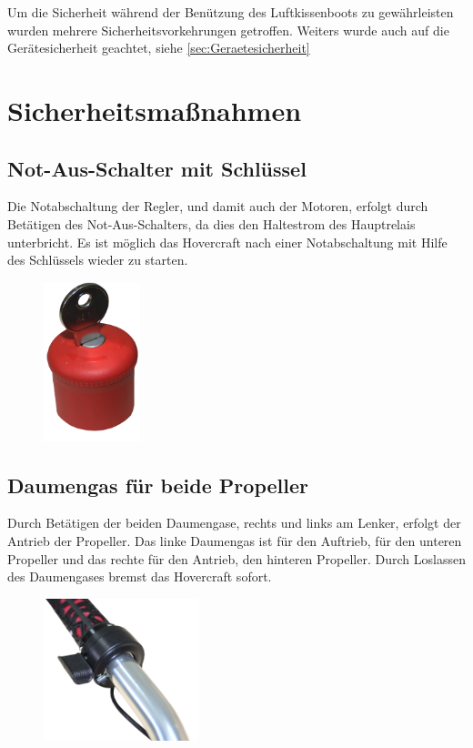
Um die Sicherheit während der Benützung des Luftkissenboots zu gewährleisten wurden mehrere Sicherheitsvorkehrungen getroffen. 
Weiters wurde auch auf die Gerätesicherheit geachtet, siehe \autoref{sec:Geraetesicherheit}
\section{Sicherheitsmaßnahmen}
\subsection{Not-Aus-Schalter mit Schlüssel}
Die Notabschaltung der Regler, und damit auch der Motoren, erfolgt durch Betätigen des Not-Aus-Schalters, da dies den Haltestrom des Hauptrelais unterbricht. 
Es ist möglich das Hovercraft nach einer Notabschaltung mit Hilfe des Schlüssels wieder zu starten. 

\begin{figure}[h]
    \centering
    \includegraphics[width=0.25\textwidth]{Fotos/Notaus.png}
\end{figure}

\newpage
\subsection{Daumengas für beide Propeller}
Durch Betätigen der beiden Daumengase, rechts und links am Lenker, erfolgt der Antrieb der Propeller. Das linke Daumengas ist für den Auftrieb, für den unteren Propeller und
das rechte für den Antrieb, den hinteren Propeller. Durch Loslassen des Daumengases bremst das Hovercraft sofort.

\begin{figure}[h]
    \centering
    \includegraphics[width=0.4\textwidth]{Fotos/Daumengas.png}
\end{figure}


